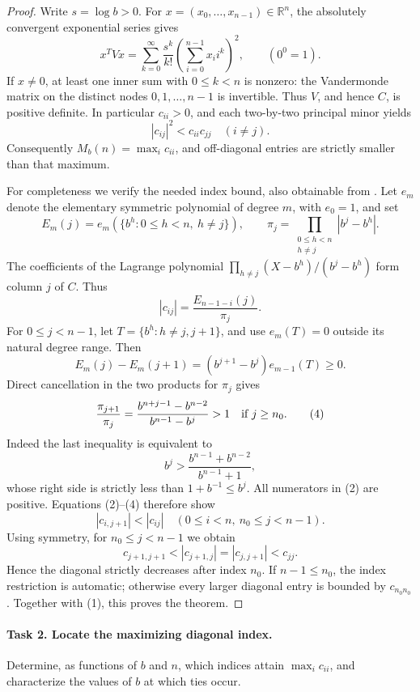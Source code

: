 \documentclass[10pt]{article}
\newcommand{\R}{\mathbb R}
\begin{document}
\begin{proof}
Write \(s=\log b>0\). For \(x=(x_0,\ldots,x_{n-1})\in\R^n\),
the absolutely convergent exponential series gives
\[
 x^TVx=\sum_{k=0}^{\infty}\frac{s^k}{k!}
             \left(\sum_{i=0}^{n-1}x_i i^k\right)^2 ,
 \qquad (0^0=1).
\]
If \(x\ne0\), at least one inner sum with \(0\le k<n\) is nonzero:
the Vandermonde matrix on the distinct nodes \(0,1,\ldots,n-1\)
is invertible. Thus \(V\), and hence \(C\), is positive definite.
In particular \(c_{ii}>0\), and each two-by-two principal minor yields
\[
 |c_{ij}|^2<c_{ii}c_{jj}\quad(i\ne j).
 \tag{1}
\]
Consequently \(M_b(n)=\max_i c_{ii}\), and off-diagonal entries are
strictly smaller than that maximum.

For completeness we verify the needed index bound, also obtainable
from \cite[Theorem 1]{SSZ}. Let \(e_m\) denote the elementary symmetric
polynomial of degree \(m\), with \(e_0=1\), and set
\[
 E_m(j)=e_m(\{b^h:0\le h<n,\ h\ne j\}),\qquad
 \pi_j=\prod_{\substack{0\le h<n\\h\ne j}}|b^j-b^h|.
\]
The coefficients of the Lagrange polynomial
\(\prod_{h\ne j}(X-b^h)/(b^j-b^h)\) form column \(j\) of \(C\).
Thus
\[
 |c_{ij}|=\frac{E_{n-1-i}(j)}{\pi_j}.                 \tag{2}
\]
For \(0\le j<n-1\), let \(T=\{b^h:h\ne j,j+1\}\), and use
\(e_m(T)=0\) outside its natural degree range. Then
\[
 E_m(j)-E_m(j+1)=(b^{j+1}-b^j)e_{m-1}(T)\ge0.       \tag{3}
\]
Direct cancellation in the two products for \(\pi_j\) gives
\[
 \frac{\pi_{j+1}}{\pi_j}
   =\frac{b^{n+j-1}-b^{n-2}}{b^{n-1}-b^j}>1
       \quad\hbox{if } j\ge n_0.                  \tag{4}
\]
Indeed the last inequality is equivalent to
\[
 b^j>\frac{b^{n-1}+b^{n-2}}{b^{n-1}+1},
\]
whose right side is strictly less than \(1+b^{-1}\le b^j\).
All numerators in (2) are positive. Equations (2)--(4) therefore show
\[
 |c_{i,j+1}|<|c_{ij}| \quad(0\le i<n,\ n_0\le j<n-1).
\]
Using symmetry, for \(n_0\le j<n-1\) we obtain
\[
 c_{j+1,j+1}<|c_{j+1,j}|=|c_{j,j+1}|<c_{jj}.
\]
Hence the diagonal strictly decreases after index \(n_0\).
If \(n-1\le n_0\), the index restriction is automatic; otherwise
every larger diagonal entry is bounded by \(c_{n_0n_0}\).
Together with (1), this proves the theorem.
\end{proof}

\paragraph{Task 2. Locate the maximizing diagonal index.}
Determine, as functions of \(b\) and \(n\), which indices attain
\(\max_i c_{ii}\), and characterize the values of \(b\) at which ties occur.
\end{document}
